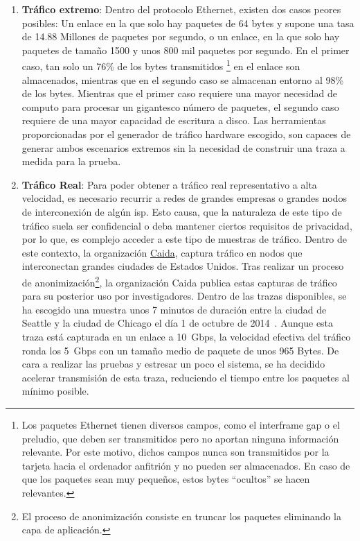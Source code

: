 \begin{enumerate}

\item \textbf{Tráfico extremo}: Dentro del protocolo Ethernet, existen dos casos peores posibles: Un enlace en la que solo hay paquetes de 64 bytes y supone una tasa de 14.88 Millones de paquetes por segundo, o un enlace, en la que solo hay paquetes de tamaño 1500 y unos 800 mil paquetes por segundo.
En el primer caso, tan solo un 76\% de los bytes transmitidos%
\footnote{Los paquetes Ethernet tienen diversos campos, como el interframe gap o el preludio, que deben ser transmitidos pero no aportan ninguna información relevante. Por este motivo, dichos campos nunca son transmitidos por la tarjeta hacia el ordenador anfitrión y no pueden ser almacenados. En caso de que los paquetes sean muy pequeños, estos bytes ``ocultos'' se hacen relevantes.} %
 en el enlace son almacenados, mientras que en el segundo caso se almacenan entorno al 98\% de los bytes. Mientras que el primer caso requiere una mayor necesidad de computo para procesar un gigantesco número de paquetes, el segundo caso requiere de una mayor capacidad de escritura a disco.
Las herramientas proporcionadas por el generador de tráfico hardware escogido, son capaces de generar ambos escenarios extremos sin la necesidad de construir una traza a medida para la prueba.

\item \textbf{Tráfico Real}: Para poder obtener a tráfico real representativo a alta velocidad, es necesario recurrir a redes de grandes empresas o grandes nodos de interconexión de algún \gls{isp}. Esto causa, que la naturaleza de este tipo de tráfico suela ser confidencial o deba mantener ciertos requisitos de privacidad, por lo que, es complejo acceder a este tipo de muestras de tráfico.
Dentro de este contexto, la organización \href{http://www.caida.org/home/}{Caida}, captura tráfico en nodos que interconectan grandes ciudades de Estados Unidos. Tras realizar un proceso de anonimización\footnote{El proceso de anonimización consiste en truncar los paquetes eliminando la capa de aplicación.}, la organización Caida publica estas capturas de tráfico para su posterior uso por investigadores. Dentro de las trazas disponibles, se ha escogido una muestra unos 7 minutos de duración entre la ciudad de Seattle y la ciudad de Chicago el día 1 de octubre de 2014~\cite{caida2014}. Aunque esta traza está capturada en un enlace a 10~Gbps, la velocidad efectiva del tráfico ronda los 5~Gbps con un tamaño medio de paquete de unos 965 Bytes. De cara a realizar las pruebas y estresar un poco el sistema, se ha decidido acelerar transmisión de esta traza, reduciendo el tiempo entre los paquetes al mínimo posible.

\end{enumerate}

